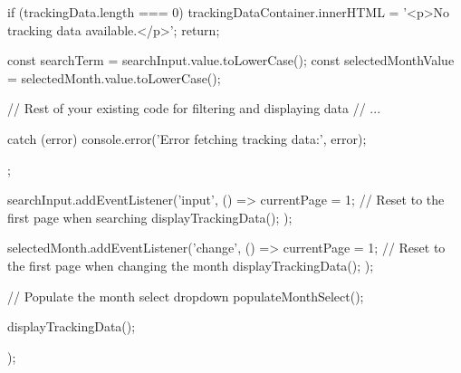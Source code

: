 {{{      if (trackingData.length === 0) {
        trackingDataContainer.innerHTML = '<p>No tracking data available.</p>';
        return;
      }

      const searchTerm = searchInput.value.toLowerCase();
      const selectedMonthValue = selectedMonth.value.toLowerCase();

      // Rest of your existing code for filtering and displaying data
      // ...

    } catch (error) {
      console.error('Error fetching tracking data:', error);
    }
  };

  searchInput.addEventListener('input', () => {
    currentPage = 1; // Reset to the first page when searching
    displayTrackingData();
  });

  selectedMonth.addEventListener('change', () => {
    currentPage = 1; // Reset to the first page when changing the month
    displayTrackingData();
  });

  // Populate the month select dropdown
  populateMonthSelect();

  displayTrackingData();
});

